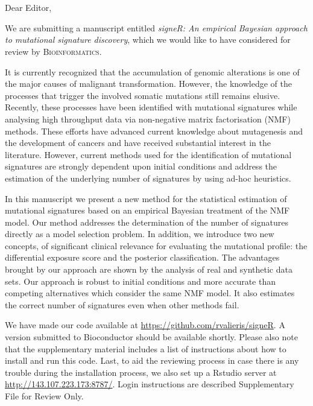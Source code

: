 \documentclass[11pt,a4paper]{letter} %
\def\opening#1{\thispagestyle{empty}
{\centering\fromaddress \vspace{0.6in} \\ %
\hspace*{\longindentation}\hspace*{\fill}\par} %
{\raggedright \toname \\ \toaddress \par} %
\vspace{0.8in} %
\noindent #1 %
\def\thefootnote{}
\def\footnoterule{\hrule}
\footnotetext{\centering{\scriptsize {\textcolor{ACCgray}{Rua Tagu\'a, 440
 - Liberdade 01508-010 S\~ao Paulo, SP - Brazil $\star$ \phone\ $+$ 55 11
  21895000 $\star$ \FAX\ $+$ 55 11 21895017}}}}
\def\thefootnote{\arabic{footnote}}
}
\begin{document}

\begin{letter}
{}


\opening{Dear Editor,}

We are submitting a manuscript entitled \emph{signeR: An empirical Bayesian 
 approach to mutational signature discovery}, which we would like to
have considered for review by \textsc{Bioinformatics}. 

It is currently recognized that the accumulation of genomic alterations is one of the major causes of malignant transformation. However, the knowledge of the processes that trigger the involved somatic mutations still remains elusive. Recently, these processes have been identified with mutational signatures while analysing high throughput data via non-negative matrix factorisation (NMF) methods.  These efforts have advanced current knowledge about mutagenesis and the development of cancers and have received
substantial interest in the literature. However, current methods used
for the identification of mutational signatures are strongly dependent
upon initial conditions and address the estimation of the underlying
number of signatures by using ad-hoc heuristics.


In this manuscript we present a new method for the statistical
estimation of mutational signatures based on an empirical Bayesian
treatment of the NMF model. Our method addresses the determination of the 
number of signatures directly as a model selection problem. In addition, we
introduce two new concepts, of significant clinical relevance for
evaluating the mutational profile: the differential exposure score and
the posterior classification. The advantages brought by our approach
are shown by the analysis of real and synthetic data sets. Our approach is
robust to initial conditions and more accurate than competing alternatives
which consider the same NMF model. It also estimates the correct
number of signatures even when other methods fail.

We have made our code available at
\url{https://github.com/rvalieris/signeR}. A version submitted to 
Bioconductor should be available shortly. Please also note that the 
supplementary material includes a list of instructions about how to
install and run this code. Last, to aid the reviewing process in case
there is any trouble during the installation process, we also
set up a Rstudio server at \url{http://143.107.223.173:8787/}. Login
instructions are described Supplementary File for Review Only.



\end{letter}
\end{document}
